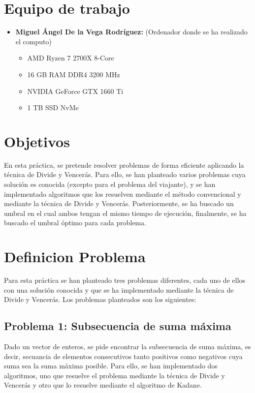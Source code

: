 \documentclass[11pt,openany]{book}
\begin{document}
\chapter{Equipo de trabajo}

\begin{itemize}
    \item \textbf{Miguel Ángel De la Vega Rodríguez:} (Ordenador donde se ha realizado el computo)
          \begin{itemize}
              \item AMD Ryzen 7 2700X 8-Core
              \item 16 GB RAM DDR4 3200 MHz
              \item NVIDIA GeForce GTX 1660 Ti
              \item 1 TB SSD NvMe
          \end{itemize}
\end{itemize}

\chapter{Objetivos}
En esta práctica, se pretende resolver problemas de forma eficiente aplicando la técnica de
Divide y Vencerás. Para ello, se han planteado varios problemas cuya solución es conocida
(excepto para el problema del viajante), y se han implementado algoritmos que los resuelven
mediante el método convencional y mediante la técnica de Divide y Vencerás. Posteriormente, se ha buscado
un umbral en el cual ambos tengan el mismo tiempo de ejecución, finalmente, se ha buscado el
umbral óptimo para cada problema.
\chapter{Definicion Problema}
Para esta práctica se han planteado tres problemas diferentes, cada uno de ellos con una solución conocida
y que se ha implementado mediante la técnica de Divide y Vencerás. Los problemas planteados son los siguientes:
\section{Problema 1: Subsecuencia de suma máxima}
Dado un vector de enteros, se pide encontrar la subsecuencia de suma máxima, es decir, secuancia de elementos consecutivos
tanto positivos como negativos cuya suma sea la suma máxima posible. Para ello, se han implementado dos algoritmos, uno
que resuelve el problema mediante la técnica de Divide y Vencerás y otro que lo resuelve mediante el algoritmo de Kadane.
\end{document}
